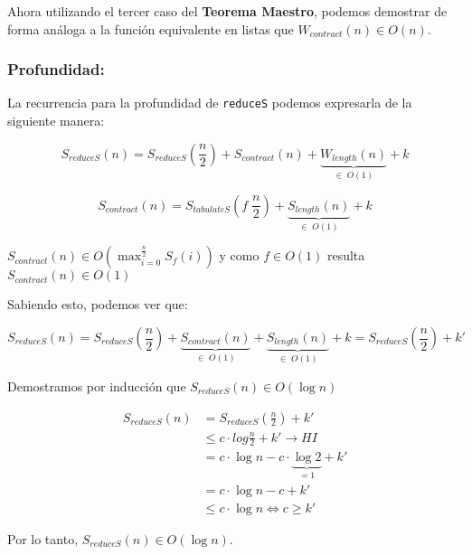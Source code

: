 \documentclass[11pt]{article}
\begin{document}
Ahora utilizando el tercer caso del \textbf{Teorema Maestro}, podemos 
demostrar de forma análoga a la función equivalente en listas que
$W_{contract}(n) \in O(n)$.

\subsubsection{Profundidad:}

La recurrencia para la profundidad de \texttt{reduceS} podemos expresarla de la siguiente manera:

\begin{equation*}
    S_{reduceS}(n) =  S_{reduceS}(\frac{n}{2}) + S_{contract}(n) + \underbrace{W_{length}(n)}_{\in \; O(1)} + k
\end{equation*}

\begin{equation*}
    S_{contract}(n) = S_{tabulateS}(f \; \frac{n}{2}) + \underbrace{S_{length}(n)}_{\in \; O(1)} + k
\end{equation*}

$S_{contract}(n) \in O\left(\displaystyle\max_{i=0}^{\frac{n}{2}}S_f(i)\right) $
y como $f\in O(1)$ resulta $S_{contract}(n) \in O(1)$

Sabiendo esto, podemos ver que:

\begin{equation*}
    S_{reduceS}(n) =  S_{reduceS}(\frac{n}{2}) +  \underbrace{S_{contract}(n) }_{\in \; O(1)} +
    \underbrace{S_{length}(n)}_{\in \; O(1)} + k =  S_{reduceS}(\frac{n}{2}) + k'
\end{equation*}

Demostramos por inducción que $S_{reduceS}(n) \in O(\log{n})$

\begin{align*}
    S_{reduceS}(n) & = S_{reduceS}(\frac{n}{2}) + k' \\
                   & \leq c \cdot log{\frac{n}{2}} + k' \rightarrow HI\\
                   & = c \cdot \log{n} - c \cdot \underbrace{\log{2}}_{= 1} + k' \\
                   & = c \cdot \log{n} - c + k' \\
                   & \leq c \cdot \log{n} \iff c \geq k'
\end{align*}

Por lo tanto, $S_{reduceS}(n) \in O(\log{n})$.

\end{document}
